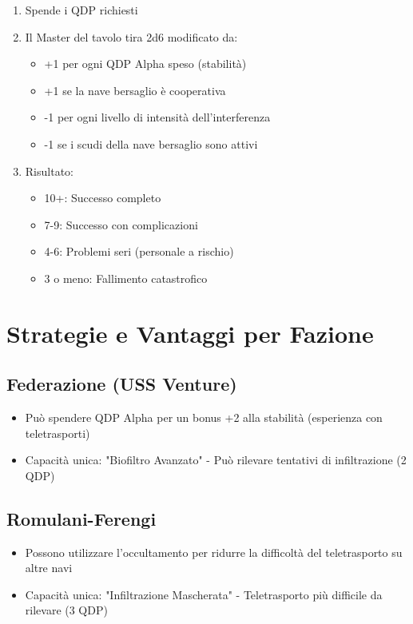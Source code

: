\documentclass[letterpaper,twocolumn,openany,nodeprecatedcode]{dndbook}
\begin{document}
\begin{enumerate}
    \item Spende i QDP richiesti
    \item Il Master del tavolo tira 2d6 modificato da:
    \begin{itemize}
    \item +1 per ogni QDP Alpha speso (stabilità)
    \item +1 se la nave bersaglio è cooperativa
    \item -1 per ogni livello di intensità dell'interferenza
    \item -1 se i scudi della nave bersaglio sono attivi
    \end{itemize}


\item Risultato:

\begin{itemize}
    \item 10+: Successo completo
    \item 7-9: Successo con complicazioni
    \item 4-6: Problemi seri (personale a rischio)
    \item 3 o meno: Fallimento catastrofico
\end{itemize}


\end{enumerate}

\section{Strategie e Vantaggi per Fazione}
\subsection{Federazione (USS Venture)}

\begin{itemize}
    \item Può spendere QDP Alpha per un bonus +2 alla stabilità (esperienza con teletrasporti)
    \item Capacità unica: "Biofiltro Avanzato" - Può rilevare tentativi di infiltrazione (2 QDP)
\end{itemize}

\subsection{Romulani-Ferengi}

\begin{itemize}
    \item Possono utilizzare l'occultamento per ridurre la difficoltà del teletrasporto su altre navi
    \item Capacità unica: "Infiltrazione Mascherata" - Teletrasporto più difficile da rilevare (3 QDP)
\end{itemize}
\end{document}
